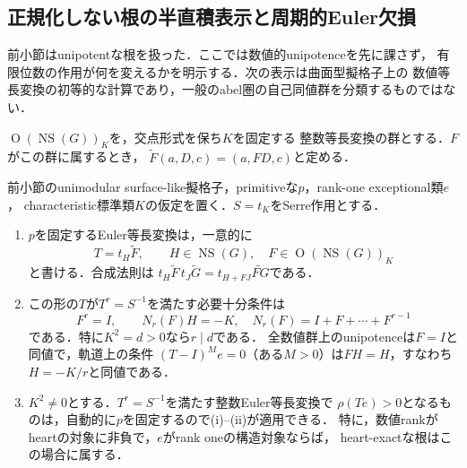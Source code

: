 \documentclass[11pt,a4paper]{ltjsarticle}
\begin{document}
\subsection{正規化しない根の半直積表示と周期的Euler欠損}
前小節はunipotentな根を扱った．ここでは数値的unipotenceを先に課さず，
有限位数の作用が何を変えるかを明示する．次の表示は曲面型擬格子上の
数値等長変換の初等的な計算であり，一般のabel圏の自己同値群を分類するものではない．

$\operatorname{O}(\operatorname{NS}(G))_K$を，交点形式を保ち$K$を固定する
整数等長変換の群とする．$F$がこの群に属するとき，
$\widetilde F(a,D,c)=(a,FD,c)$と定める．

\begin{theorem}[正規化しない数値根の分類]\label{thm:twisted-lattice-root}
前小節のunimodular surface-like擬格子，primitiveな$p$，rank-one exceptional類$e$，
characteristic標準類$K$の仮定を置く．$S=t_K$をSerre作用とする．
\begin{enumerate}[label=(\roman*)]
\item $p$を固定するEuler等長変換は，一意的に
\[
 T=t_H\widetilde F,\qquad H\in\operatorname{NS}(G),\quad
 F\in\operatorname{O}(\operatorname{NS}(G))_K
\]
と書ける．合成法則は
$t_H\widetilde F\,t_J\widetilde G=t_{H+FJ}\widetilde{FG}$である．
\item この形の$T$が$T^r=S^{-1}$を満たす必要十分条件は
\[
 F^r=I,\qquad N_r(F)H=-K,\quad
 N_r(F)=I+F+\cdots+F^{r-1}
\]
である．特に$K^2=d>0$なら$r\mid d$である．
全数値群上のunipotenceは$F=I$と同値で，軌道上の条件
$(T-I)^Me=0$（ある$M>0$）は$FH=H$，すなわち$H=-K/r$と同値である．
\item $K^2\ne0$とする．$T^r=S^{-1}$を満たす整数Euler等長変換で
$\rho(Te)>0$となるものは，自動的に$p$を固定するので(i)--(ii)が適用できる．
特に，数値rankがheartの対象に非負で，$e$がrank oneの構造対象ならば，
heart-exactな根はこの場合に属する．
\end{enumerate}
\end{theorem}
\end{document}
